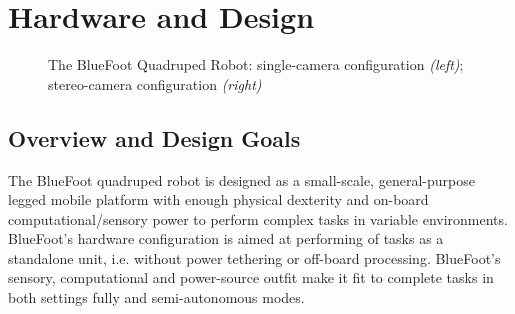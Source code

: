 \label{ch::hardware_and_design}
\chapter{Hardware and Design}
	\begin{figure}[h!]
		\centering
		\caption{The BlueFoot Quadruped Robot: single-camera configuration \emph{(left)}; stereo-camera configuration \emph{(right)}}
		\label{fig::bluefoot}
	\end{figure}

	\section{Overview and Design Goals}
	
	The BlueFoot quadruped robot is designed as a small-scale, general-purpose legged mobile platform with enough physical dexterity and on-board computational/sensory power to perform complex tasks in variable environments. BlueFoot's hardware configuration is aimed at performing of tasks as a standalone unit, i.e. without power tethering or off-board processing. BlueFoot's sensory, computational and power-source outfit make it fit to complete tasks in both settings fully and semi-autonomous modes.

